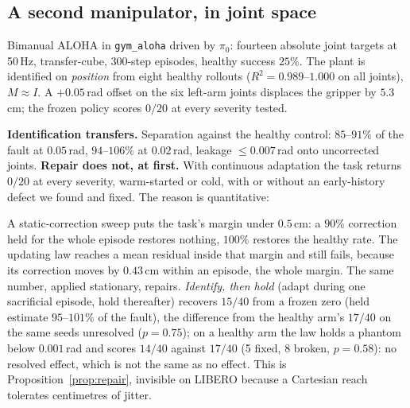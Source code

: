 \documentclass{article}
\newcommand{\code}[1]{\texttt{\small #1}}
\begin{document}
\subsection{A second manipulator, in joint space}
\label{sec:aloha}

Bimanual ALOHA in \code{gym\_aloha} driven by $\pi_0$: fourteen absolute joint targets at
50\,Hz, transfer-cube, 300-step episodes, healthy success $25\%$. The plant is identified on
\emph{position} from eight healthy rollouts ($R^2 = 0.989$--$1.000$ on all joints),
$M\approx I$. A $+0.05$\,rad offset on the six left-arm joints displaces the gripper by
$5.3$\,cm; the frozen policy scores $0/20$ at every severity tested.

\textbf{Identification transfers.} Separation against the healthy control: $85$--$91\%$ of
the fault at $0.05$\,rad, $94$--$106\%$ at $0.02$\,rad, leakage $\le0.007$\,rad onto
uncorrected joints. \textbf{Repair does not, at first.} With continuous adaptation the task
returns $0/20$ at every severity, warm-started or cold, with or without an early-history
defect we found and fixed. The reason is quantitative:

\begin{center}\small
{}
\end{center}

A static-correction sweep puts the task's margin under $0.5$\,cm: a $90\%$ correction held
for the whole episode restores nothing, $100\%$ restores the healthy rate. The updating law
reaches a mean residual inside that margin and still fails, because its correction moves by
$0.43$\,cm within an episode, the whole margin. The same number, applied stationary,
repairs. \emph{Identify, then hold} (adapt during one sacrificial episode, hold thereafter)
recovers $15/40$ from a frozen zero (held estimate $95$--$101\%$ of the fault),
the difference from the healthy arm's $17/40$ on the same seeds unresolved ($p=0.75$); on a
healthy arm the law holds a phantom below $0.001$\,rad and scores $14/40$ against $17/40$
(5 fixed, 8 broken, $p=0.58$): no resolved effect, which is not the same as no effect. This is
Proposition~\ref{prop:repair}, invisible on LIBERO because a Cartesian reach tolerates
centimetres of jitter.
\end{document}
